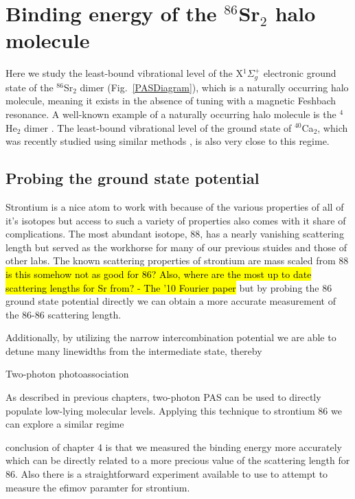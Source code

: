\chapter{Binding energy of the $^{86}$Sr$_2$ halo molecule}
\label{ch:chap4}

Here we study the least-bound vibrational level of the X$^1\Sigma_g^+$ electronic ground state of the $^{86}$Sr$_2$ dimer (Fig.\ \ref{PASDiagram}), which is a naturally occurring halo molecule, meaning it exists in the absence of tuning with a magnetic Feshbach resonance. A well-known example of a naturally occurring halo molecule is the $^4$He$_2$ dimer \cite{lmk93,sto94,kgj06}. The least-bound vibrational level of the ground state of $^{40}$Ca$_2$, which was recently studied using similar methods \cite{Pachomow2017a}, is also very close to this regime.

\section{Probing the ground state potential}
\label{sec:lowE_intro}

Strontium is a nice atom to work with because of the various properties of all of it's isotopes but access to such a variety of properties also comes with it share of complications. The most abundant isotope, 88, has a nearly vanishing scattering length but served as the workhorse for many of our previous stuides and those of other labs. The known scattering properties of strontium are mass scaled from 88 \hl{is this somehow not as good for 86? Also, where are the most up to date scattering lengths for Sr from? - The '10 Fourier paper} but by probing the 86 ground state potential directly we can obtain a more accurate measurement of the 86-86 scattering length.

Additionally, by utilizing the narrow intercombination potential we are able to detune many linewidths from the intermediate state, thereby 

Two-photon photoassociation 

As described in previous chapters, two-photon PAS can be used to directly populate low-lying molecular levels. Applying this technique to strontium 86 we can explore a similar regime

conclusion of chapter 4 is that we measured the binding energy more accurately which can be directly related to a more precious value of the scattering length for 86. Also there is a straightforward experiment available to use to attempt to measure the efimov paramter for strontium.

